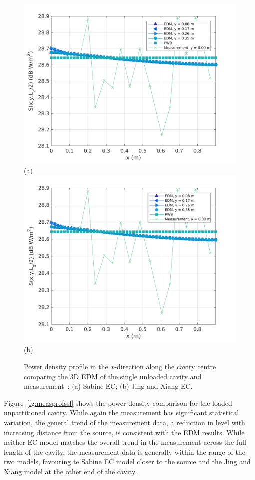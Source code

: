 \documentclass[a4paper]{article}
\numberwithin{equation}{section}
\newcounter{Figure}
\begin{document}
\begin{figure}[hp]
\begin{center}
\includegraphics[width=0.6\linewidth]{figures/SDM_3D_SU_PowerDensityProfileXMeas}\\
{\footnotesize (a)}\\
\vspace{2mm}
\includegraphics[width=0.6\linewidth]{figures/SDM_3D_SU_PowerDensityProfileXMeas_JX}\\
{\footnotesize (b)}\\
\vspace{-2mm}
\caption{\label{fg:measprofssu} Power density profile in the $x$-direction along the cavity centre comparing
the 3D EDM of the single unloaded cavity and measurement~\citep{Flintoft2017b}: (a) Sabine EC; (b) Jing and Xiang EC.}
\end{center}
\end{figure}

Figure~\ref{fg:measprofssl} shows the power density comparison for the loaded unpartitioned cavity. While again the 
measurement has significant statistical variation, the general trend of the measurement data, a reduction in level
with increasing distance from the source, is consistent with the EDM results. While neither EC model matches 
the overall trend in the measurement across the full length of the cavity, the measurement data is generally within
the range of the two models, favouring te Sabine EC model closer to the source and the Jing and Xiang model at the other
end of the cavity.
\end{document}
